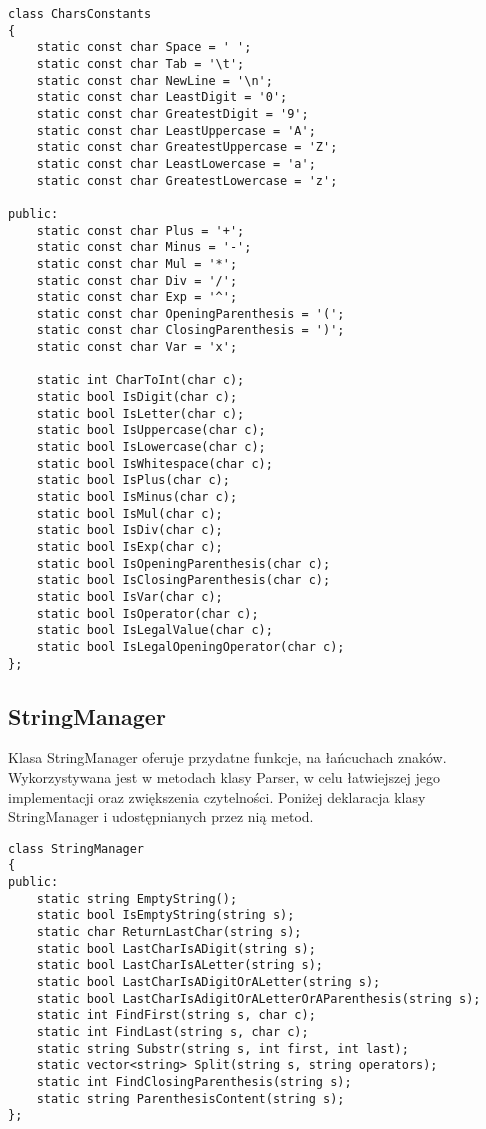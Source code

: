 \documentclass[twoside,a4paper]{book}
\begin{document}
\begin{lstlisting}
class CharsConstants
{
	static const char Space = ' ';
	static const char Tab = '\t';
	static const char NewLine = '\n';
	static const char LeastDigit = '0';
	static const char GreatestDigit = '9';
	static const char LeastUppercase = 'A';
	static const char GreatestUppercase = 'Z';
	static const char LeastLowercase = 'a';
	static const char GreatestLowercase = 'z';
	
public:
	static const char Plus = '+';
	static const char Minus = '-';
	static const char Mul = '*';
	static const char Div = '/';
	static const char Exp = '^';
	static const char OpeningParenthesis = '(';
	static const char ClosingParenthesis = ')';
	static const char Var = 'x';
	
	static int CharToInt(char c);
	static bool IsDigit(char c);
	static bool IsLetter(char c);
	static bool IsUppercase(char c);
	static bool IsLowercase(char c);
	static bool IsWhitespace(char c);
	static bool IsPlus(char c);
	static bool IsMinus(char c);
	static bool IsMul(char c);
	static bool IsDiv(char c);
	static bool IsExp(char c);
	static bool IsOpeningParenthesis(char c);
	static bool IsClosingParenthesis(char c);
	static bool IsVar(char c);
	static bool IsOperator(char c);
	static bool IsLegalValue(char c);
	static bool IsLegalOpeningOperator(char c);
};
\end{lstlisting}


\subsection{StringManager}

Klasa StringManager oferuje przydatne funkcje, na łańcuchach znaków. Wykorzystywana jest w metodach klasy Parser, w celu łatwiejszej jego implementacji oraz zwiększenia czytelności. Poniżej deklaracja klasy StringManager i udostępnianych przez nią metod.

\begin{lstlisting}
class StringManager
{
public:
	static string EmptyString();
	static bool IsEmptyString(string s);
	static char ReturnLastChar(string s);
	static bool LastCharIsADigit(string s);
	static bool LastCharIsALetter(string s);
	static bool LastCharIsADigitOrALetter(string s);
	static bool LastCharIsAdigitOrALetterOrAParenthesis(string s);
	static int FindFirst(string s, char c);
	static int FindLast(string s, char c);
	static string Substr(string s, int first, int last);
	static vector<string> Split(string s, string operators);
	static int FindClosingParenthesis(string s);
	static string ParenthesisContent(string s);
};
\end{lstlisting}
\end{document}
